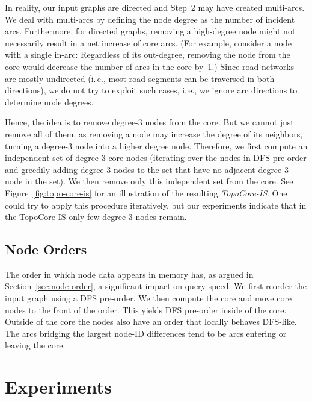 \documentclass{sig-alternate}
\newcommand{\ie}{i.\,e.\xspace}
\begin{document}
In reality, our input graphs are directed and Step~2 may have created multi-arcs.
We deal with multi-arcs by defining the node degree as the number of incident arcs.
Furthermore, for directed graphs, removing a high-degree node might not necessarily result in a net increase of core arcs. (For example, consider a node with a single in-arc: Regardless of its out-degree, removing the node from the core would decrease the number of arcs in the core by~1.) Since road networks are mostly undirected (\ie, most road segments can be traversed in both directions), we do not try to exploit such cases, \ie, we ignore arc directions to determine node degrees. 

Hence, the idea is to remove degree-3 nodes from the core. But we cannot just remove all of them, as removing
a node may increase the degree of its neighbors, turning a degree-3
node into a higher degree node. Therefore, we first compute an independent
set of degree-3 core nodes (iterating over the nodes in DFS pre-order and greedily adding
degree-3 nodes to the set that have no adjacent degree-3 node in the set). We then remove only this independent set from the
core. See Figure~\ref{fig:topo-core-is} for an illustration of the resulting \emph{TopoCore-IS}.
One could try to apply this procedure iteratively, but our experiments indicate that in the TopoCore-IS only few degree-3 nodes remain.






\subsection{Node Orders}

The order in which node data appears in memory has, as argued
in Section~\ref{sec:node-order}, a significant impact on query speed. We first reorder the input graph using a DFS pre-order. We then compute the core and move
core nodes to the front of the order. This yields DFS pre-order
inside of the core. Outside of the core the nodes also have an order
that locally behaves DFS-like. The arcs bridging the largest
node-ID differences tend to be arcs entering or leaving the core. 

\section{Experiments} \label{sec:Experiments}
\end{document}

